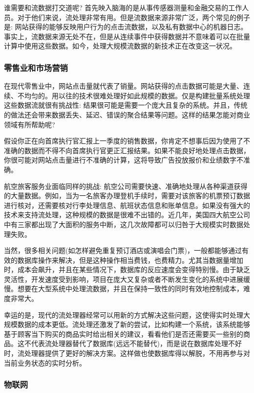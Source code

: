 \documentclass[oneside]{ctexbook}
\begin{document}
谁需要和流数据打交道呢? 首先映入脑海的是从事传感器测量和金融交易的工作人员。对于他们来说，流处理非常有用。但是流数据来源非常广泛，两个常见的例子是: 网站获得的能够反映用户行为的点击流数据，以及私有数据中心的机器日志。事实上，流数据来源无处不在，但是从连续事件中获得数据并不意味着可以在批量计算中使用这些数据。如今，处理大规模流数据的新技术正在改变这一状况。

\subsubsection{零售业和市场营销}

在现代零售业中，网站点击量就代表了销量。网站获得的点击数据可能是大量、连续、不均匀的。用以往的技术很难处理好如此规模的数据。仅是构建批量系统处理这些数据流就很有挑战性: 结果很可能是需要一个庞大且复杂的系统。并且，传统的做法还会带来数据丢失、延迟、错误的聚合结果等问题。这样的结果怎能对商业领域有所帮助呢?

假设你正在向首席执行官汇报上一季度的销售数据，你肯定不想事后因为使用了不准确的数据而不得不向首席执行官更正汇报结果。如果不能良好地处理点击数据，你很可能对网站点击量进行不准确的计算，这将导致广告投放报价和业绩数字不准确。

航空旅客服务业面临同样的挑战: 航空公司需要快速、准确地处理从各种渠道获得的大量数据。例如，当为一名旅客办理登机手续时，需要对该旅客的机票预订数据进行核对，还需要核对行李处理信息、航班状态信息和账单信息。如果没有强大的技术来支持流处理，这种规模的数据是很难不出错的。近几年，美国四大航空公司中有三家都出现了大面积的服务中断，这几次故障都可以归咎于大规模实时数据处理失败。

当然，很多相关问题(如怎样避免重复预订酒店或演唱会门票)，一般都能够通过有效的数据库操作来解决，但是这种操作相当费钱，也费精力。尤其当数据量增加时，成本会飙升，并且在某些情况下，数据库的反应速度会变得特别慢。由于缺乏灵活性，开发速度受到影响，项目在庞大又复杂或者不断发生变化的系统中进展缓慢。想要在大型系统中处理流数据，并且在保持一致性的同时有效地控制成本，难度非常大。

幸运的是，现代的流处理器经常可以用新的方式解决这些问题，这使得实时处理大规模数据的成本更低。流处理还激发了新的尝试，比如构建一个系统，该系统能够基于顾客当下购买的商品实时给出相关的建议，看看他们是否还需要买一些别的商品。这不代表流处理器替代了数据库(远远不能替代)，而是说在数据库处理不好时，流处理器提供了更好的解决方案。这样做也使数据库得以解脱，不用再参与对当前业务状态的实时分析。

\subsubsection{物联网}
\end{document}
